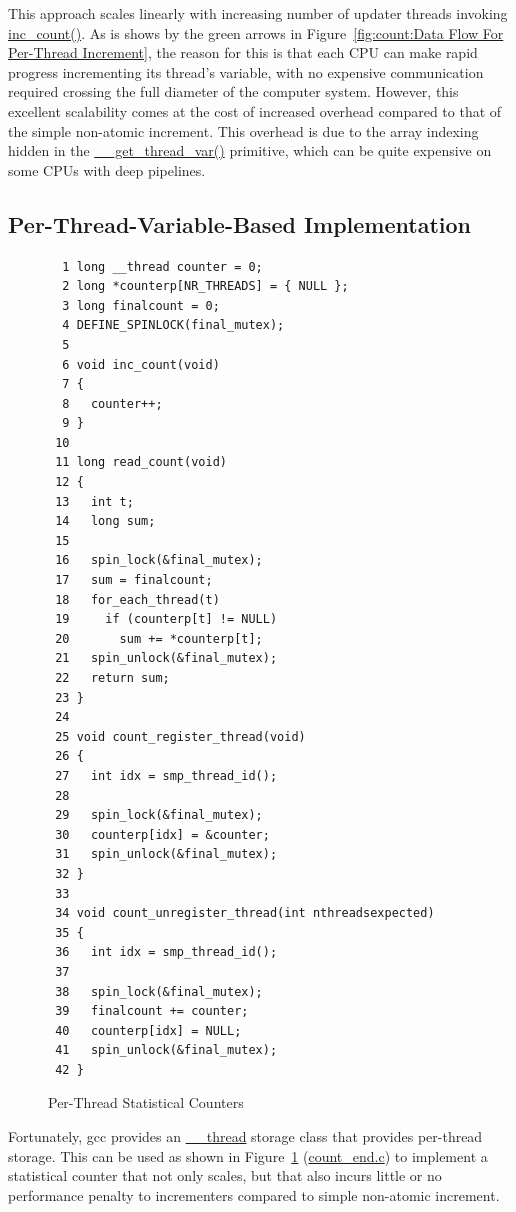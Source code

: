 This approach scales linearly with increasing number of updater threads
invoking \url{inc_count()}.
As is shows by the green arrows in
Figure~\ref{fig:count:Data Flow For Per-Thread Increment},
the reason for this is that each CPU can make rapid progress incrementing
its thread's variable, with no expensive communication required crossing
the full diameter of the computer system.
However, this excellent scalability comes at the cost of increased
overhead compared to that of the simple non-atomic increment.
This overhead is due to the array indexing hidden in the
\url{__get_thread_var()} primitive, which can be quite expensive
on some CPUs with deep pipelines.

\subsection{Per-Thread-Variable-Based Implementation}
\label{sec:count:Per-Thread-Variable-Based Implementation}

\begin{figure}[tbp]
{ \scriptsize
\begin{verbatim}
  1 long __thread counter = 0;
  2 long *counterp[NR_THREADS] = { NULL };
  3 long finalcount = 0;
  4 DEFINE_SPINLOCK(final_mutex);
  5 
  6 void inc_count(void)
  7 {
  8   counter++;
  9 }
 10 
 11 long read_count(void)
 12 {
 13   int t;
 14   long sum;
 15 
 16   spin_lock(&final_mutex);
 17   sum = finalcount;
 18   for_each_thread(t)
 19     if (counterp[t] != NULL)
 20       sum += *counterp[t];
 21   spin_unlock(&final_mutex);
 22   return sum;
 23 }
 24 
 25 void count_register_thread(void)
 26 {
 27   int idx = smp_thread_id();
 28 
 29   spin_lock(&final_mutex);
 30   counterp[idx] = &counter;
 31   spin_unlock(&final_mutex);
 32 }
 33 
 34 void count_unregister_thread(int nthreadsexpected)
 35 {
 36   int idx = smp_thread_id();
 37 
 38   spin_lock(&final_mutex);
 39   finalcount += counter;
 40   counterp[idx] = NULL;
 41   spin_unlock(&final_mutex);
 42 }
\end{verbatim}
}
\caption{Per-Thread Statistical Counters}
\label{fig:count:Per-Thread Statistical Counters}
\end{figure}

Fortunately, gcc provides an \url{__thread} storage class that provides
per-thread storage.
This can be used as shown in
Figure~\ref{fig:count:Per-Thread Statistical Counters} (\url{count_end.c})
to implement
a statistical counter that not only scales, but that also incurs little
or no performance penalty to incrementers compared to simple non-atomic
increment.

